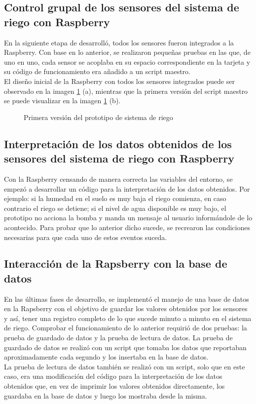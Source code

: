 \subsection{Control grupal de los sensores del sistema de riego con Raspberry}
En la siguiente etapa de desarroll\'o, todos los sensores fueron integrados a la Raspberry. Con base en lo anterior, se realizaron peque\~{n}as pruebas en las que, de uno en uno, cada sensor se acoplaba en su espacio correspondiente en la tarjeta y su c\'odigo de funcionamiento era a\~{n}adido a un script maestro.\\ 
El dise\~{n}o inicial de la Raspberry con todos los sensores integrados puede ser observado en la imagen \ref{todo} (a), mientras que la primera versi\'on del script maestro se puede visualizar en la imagen \ref{todo} (b). 
 
\begin{figure}[H]
	\begin{center}
	\end{center}
	\label{todo}
	\caption{Primera versi\'on del prototipo de sistema de riego}
\end{figure} 


\subsection{Interpretaci\'{o}n de los datos obtenidos de los sensores del sistema de riego con Raspberry}
Con la Raspberry censando de manera correcta las variables del entorno, se empez\'o a desarrollar un c\'odigo para la interpretaci\'on de los datos obtenidos. Por ejemplo: si la humedad en el suelo es muy baja el riego comienza, en caso contrario el riego se detiene; si el nivel de agua disponible es muy bajo, el prototipo no acciona la bomba y manda un mensaje al usuario inform\'andole de lo acontecido. Para probar que lo anterior dicho sucede, se recrearon las condiciones necesarias para que cada uno de estos eventos suceda.

\subsection{Interacci\'on de la Rapsberry con la base de datos}
En las \'ultimas fases de desarrollo, se implement\'o el manejo de una base de datos en la Rapsberry con el objetivo de guardar los valores obtenidos por los sensores y as\'i, tener una registro completo de lo que sucede minuto a minuto en el sistema de riego. Comprobar el funcionamiento de lo anterior requiri\'o de dos pruebas: la prueba de guardado de datos y la prueba de lectura de datos.
La prueba de guardado de datos se realiz\'o con un script que tomaba los datos que reportaban aproximadamente cada segundo y los insertaba en la base de datos.\\
La prueba de lectura de datos tambi\'en se realiz\'o con un script, solo que en este caso, era una modificaci\'on del c\'odigo para la interpretaci\'on de los datos obtenidos que, en vez de imprimir los valores obtenidos directamente, los guardaba en la base de datos y luego los mostraba desde la misma.

